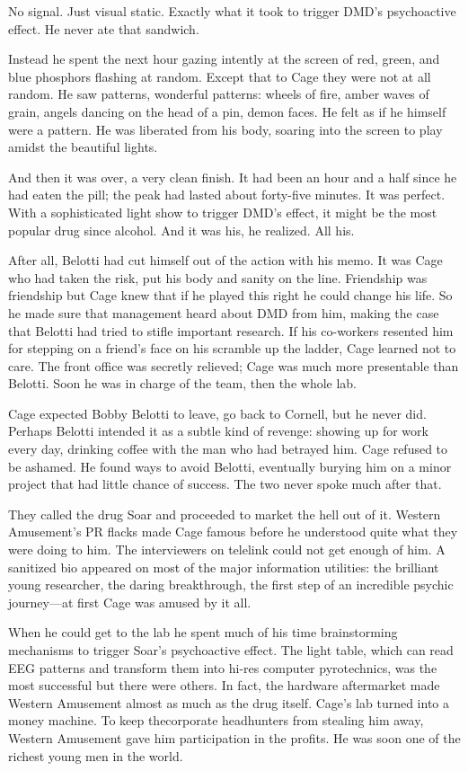 No signal. Just visual static. Exactly what it took to trigger DMD’s psychoactive effect. He never ate that sandwich.

Instead he spent the next hour gazing intently at the screen of red, green, and blue phosphors flashing at random. Except that to Cage they were not at all random. He saw patterns, wonderful patterns: wheels of fire, amber waves of grain, angels dancing on the head of a pin, demon faces. He felt as if he himself were a pattern. He was liberated from his body, soaring into the screen to play amidst the beautiful lights.

And then it was over, a very clean finish. It had been an hour and a half since he had eaten the pill; the peak had lasted about forty-five minutes. It was perfect. With a sophisticated light show to trigger DMD’s effect, it might be the most popular drug since alcohol. And it was his, he realized. All his.

After all, Belotti had cut himself out of the action with his memo. It was Cage who had taken the risk, put his body and sanity on the line. Friendship was friendship but Cage knew that if he played this right he could change his life. So he made sure that management heard about DMD from him, making the case that Belotti had tried to stifle important research. If his co-workers resented him for stepping on a friend’s face on his scramble up the ladder, Cage learned not to care. The front office was secretly relieved; Cage was much more presentable than Belotti. Soon he was in charge of the team, then the whole lab.

Cage expected Bobby Belotti to leave, go back to Cornell, but he never did. Perhaps Belotti intended it as a subtle kind of revenge: showing up for work every day, drinking coffee with the man who had betrayed him. Cage refused to be ashamed. He found ways to avoid Belotti, eventually burying him on a minor project that had little chance of success. The two never spoke much after that.

They called the drug Soar and proceeded to market the hell out of it. Western Amusement’s PR flacks made Cage famous before he understood quite what they were doing to him. The interviewers on telelink could not get enough of him. A sanitized bio appeared on most of the major information utilities: the brilliant young researcher, the daring breakthrough, the first step of an incredible psychic journey—at first Cage was amused by it all.

When he could get to the lab he spent much of his time brainstorming mechanisms to trigger Soar’s psychoactive effect. The light table, which can read EEG patterns and transform them into hi-res computer pyrotechnics, was the most successful but there were others. In fact, the hardware aftermarket made Western Amusement almost as much as the drug itself. Cage’s lab turned into a money machine. To keep thecorporate headhunters from stealing him away, Western Amusement gave him participation in the profits. He was soon one of the richest young men in the world.

